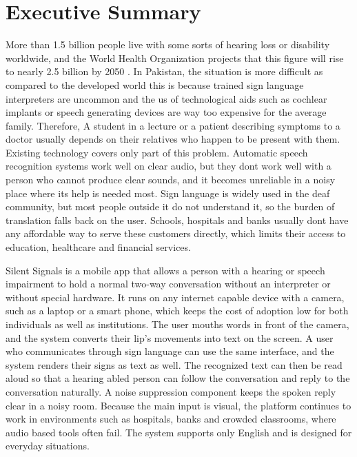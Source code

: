 \documentclass{FastFyp}
\begin{document}
\section*{Executive Summary}
More than 1.5 billion people live with some sorts of hearing loss or disability worldwide, 
and the World Health Organization projects that this figure will rise to nearly 2.5 billion by 2050 \cite{who2021}. 
In Pakistan, the situation is more difficult as compared to the developed world this is because trained sign language interpreters are uncommon and the us of technological aids such as cochlear implants or speech generating devices are way too expensive for the average family. 
Therefore, A student in a lecture or a patient describing symptoms to a doctor usually depends on their relatives who happen to be present with them. 
Existing technology covers only part of this problem. Automatic speech recognition systems work well on clear audio, but they dont work well with a person who cannot produce clear sounds, 
and it becomes unreliable in a noisy place where its help is needed most. 
Sign language is widely used in the deaf community, but most people outside it do not understand it, so the burden of translation falls back on the user. Schools, hospitals and banks usually dont have any affordable way to serve these customers directly, 
which limits their access to education, healthcare and financial services.

Silent Signals is a mobile app that allows a person with a hearing or speech impairment to hold a normal two-way conversation without an interpreter or without special hardware. 
It runs on any internet capable device with a camera, such as a laptop or a smart phone, which keeps the cost of adoption low for both individuals as well as institutions. 
The user mouths words in front of the camera, and the system converts their lip's movements into text on the screen. 
A user who communicates through sign language can use the same interface, and the system renders their signs as text as well. 
The recognized text can then be read aloud so that a hearing abled person can follow the conversation and reply to the conversation naturally. 
A noise suppression component keeps the spoken reply clear in a noisy room. 
Because the main input is visual, the platform continues to work in environments such as hospitals, banks and crowded classrooms, where audio based tools often fail. The system supports only English and is designed for everyday situations.
\end{document}
